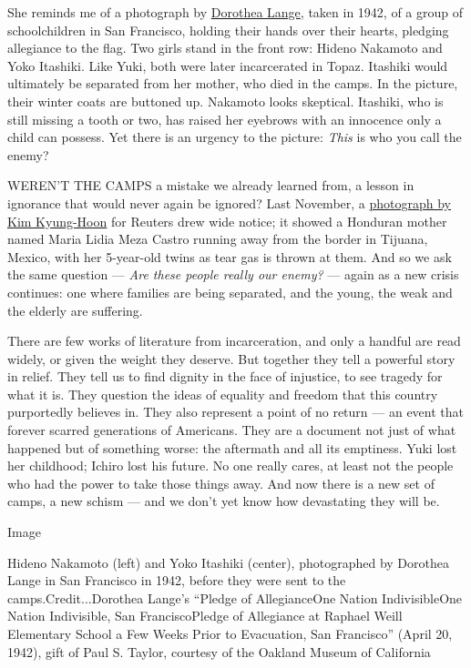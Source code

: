 She reminds me of a photograph by
\href{https://www.nytimes3xbfgragh.onion/2018/11/28/lens/dorothea-lange-migrant-mother.html}{Dorothea
Lange}, taken in 1942, of a group of schoolchildren in San Francisco,
holding their hands over their hearts, pledging allegiance to the flag.
Two girls stand in the front row: Hideno Nakamoto and Yoko Itashiki.
Like Yuki, both were later incarcerated in Topaz. Itashiki would
ultimately be separated from her mother, who died in the camps. In the
picture, their winter coats are buttoned up. Nakamoto looks skeptical.
Itashiki, who is still missing a tooth or two, has raised her eyebrows
with an innocence only a child can possess. Yet there is an urgency to
the picture: \emph{This} is who you call the enemy?

WEREN'T THE CAMPS a mistake we already learned from, a lesson in
ignorance that would never again be ignored? Last November, a
\href{https://widerimage.reuters.com/story/honduran-migrant-flees-tear-gas-with-her-children}{photograph
by Kim Kyung-Hoon} for Reuters drew wide notice; it showed a Honduran
mother named Maria Lidia Meza Castro running away from the border in
Tijuana, Mexico, with her 5-year-old twins as tear gas is thrown at
them. And so we ask the same question --- \emph{Are these people really
our enemy?} --- again as a new crisis continues: one where families are
being separated, and the young, the weak and the elderly are suffering.

There are few works of literature from incarceration, and only a handful
are read widely, or given the weight they deserve. But together they
tell a powerful story in relief. They tell us to find dignity in the
face of injustice, to see tragedy for what it is. They question the
ideas of equality and freedom that this country purportedly believes in.
They also represent a point of no return --- an event that forever
scarred generations of Americans. They are a document not just of what
happened but of something worse: the aftermath and all its emptiness.
Yuki lost her childhood; Ichiro lost his future. No one really cares, at
least not the people who had the power to take those things away. And
now there is a new set of camps, a new schism --- and we don't yet know
how devastating they will be.

Image

Hideno Nakamoto (left) and Yoko Itashiki (center), photographed by
Dorothea Lange in San Francisco in 1942, before they were sent to the
camps.Credit...Dorothea Lange's ``Pledge of Allegiance\textbar{}One
Nation Indivisible\textbar{}One Nation Indivisible, San
Francisco\textbar{}Pledge of Allegiance at Raphael Weill Elementary
School a Few Weeks Prior to Evacuation, San Francisco'' (April 20,
1942), gift of Paul S. Taylor, courtesy of the Oakland Museum of
California

